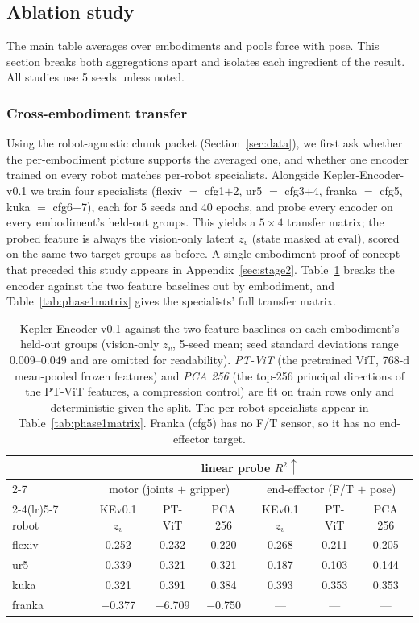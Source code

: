 \documentclass{article}
\begin{document}
\subsection{Ablation study}
\label{sec:ablations}
The main table averages over embodiments and pools force with pose. This section breaks both aggregations apart and isolates each ingredient of the result. All studies use 5 seeds unless noted.

\subsubsection{Cross-embodiment transfer}
\label{sec:phase1}
Using the robot-agnostic chunk packet (Section~\ref{sec:data}), we first ask whether the per-embodiment picture supports the averaged one, and whether one encoder trained on every robot matches per-robot specialists. Alongside Kepler-Encoder-v0.1 we train four specialists (flexiv $=$ cfg1$+$2, ur5 $=$ cfg3$+$4, franka $=$ cfg5, kuka $=$ cfg6$+$7), each for 5 seeds and 40 epochs, and probe every encoder on every embodiment's held-out groups. This yields a $5\times4$ transfer matrix; the probed feature is always the vision-only latent $z_v$ (state masked at eval), scored on the same two target groups as before. A single-embodiment proof-of-concept that preceded this study appears in Appendix~\ref{sec:stage2}. Table~\ref{tab:phase1diag} breaks the encoder against the two feature baselines out by embodiment, and Table~\ref{tab:phase1matrix} gives the specialists' full transfer matrix.

\begin{table}[!htbp]
  \centering
  \small
  \caption{Kepler-Encoder-v0.1 against the two feature baselines on each
  embodiment's held-out groups (vision-only $z_v$, 5-seed mean; seed standard deviations range $0.009$--$0.049$ and are omitted for readability). \emph{PT-ViT} (the pretrained ViT, 768-d mean-pooled frozen features) and \emph{PCA 256} (the top-256 principal directions of the PT-ViT features, a compression control) are fit on train rows only and deterministic given the split. The per-robot specialists appear in Table~\ref{tab:phase1matrix}. Franka (cfg5) has no F/T sensor, so it has no end-effector target.}
  \label{tab:phase1diag}
  \begin{tabular}{lcccccc}
    \toprule
    & \multicolumn{6}{c}{linear probe $R^2\uparrow$} \\
    \cmidrule(lr){2-7}
    & \multicolumn{3}{c}{motor (joints $+$ gripper)} & \multicolumn{3}{c}{end-effector (F/T $+$ pose)} \\
    \cmidrule(lr){2-4}\cmidrule(lr){5-7}
    robot & KEv0.1 $z_v$ & PT-ViT & PCA 256 & KEv0.1 $z_v$ & PT-ViT & PCA 256 \\
    \midrule
    flexiv & 0.252 & 0.232 & 0.220 & 0.268 & 0.211 & 0.205 \\
    ur5    & 0.339 & 0.321 & 0.321 & 0.187 & 0.103 & 0.144 \\
    kuka   & 0.321 & 0.391 & 0.384 & 0.393 & 0.353 & 0.353 \\
    franka & $-$0.377 & $-$6.709 & $-$0.750 & --- & --- & --- \\
    \bottomrule
  \end{tabular}
\end{table}
\end{document}

